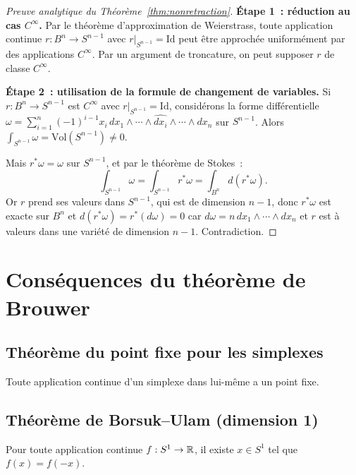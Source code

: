 \begin{proof}[Preuve analytique du Th\'eor\`eme~\ref{thm:nonretraction}]
\textbf{\'Etape 1~: r\'eduction au cas $C^\infty$.}
Par le th\'eor\`eme d'approximation de Weierstrass, toute application continue
$r : B^n \to S^{n-1}$ avec $r|_{S^{n-1}} = \mathrm{Id}$ peut \^etre approch\'ee
uniform\'ement par des applications $C^\infty$. Par un argument de troncature,
on peut supposer $r$ de classe $C^\infty$.

\textbf{\'Etape 2~: utilisation de la formule de changement de variables.}
Si $r : B^n \to S^{n-1}$ est $C^\infty$ avec $r|_{S^{n-1}} = \mathrm{Id}$,
consid\'erons la forme diff\'erentielle $\omega = \sum_{i=1}^n (-1)^{i-1} x_i \,
dx_1 \wedge \cdots \wedge \widehat{dx_i} \wedge \cdots \wedge dx_n$ sur $S^{n-1}$.
Alors $\int_{S^{n-1}} \omega = \mathrm{Vol}(S^{n-1}) \neq 0$.

Mais $r^*\omega = \omega$ sur $S^{n-1}$, et par le th\'eor\`eme de Stokes~:
\[
    \int_{S^{n-1}} \omega = \int_{S^{n-1}} r^*\omega = \int_{B^n} d(r^*\omega).
\]
Or $r$ prend ses valeurs dans $S^{n-1}$, qui est de dimension $n-1$, donc
$r^*\omega$ est exacte sur $B^n$ et $d(r^*\omega) = r^*(d\omega) = 0$ car
$d\omega = n \, dx_1 \wedge \cdots \wedge dx_n$ et $r$ est \`a valeurs dans une
vari\'et\'e de dimension $n-1$. Contradiction.
\end{proof}

\section{Cons\'equences du th\'eor\`eme de Brouwer}

\subsection{Th\'eor\`eme du point fixe pour les simplexes}

\begin{corollaire}
Toute application continue d'un simplexe dans lui-m\^eme a un point fixe.
\end{corollaire}

\subsection{Th\'eor\`eme de Borsuk--Ulam (dimension 1)}

\begin{theoreme}
Pour toute application continue $f : S^1 \to \mathbb{R}$, il existe $x \in S^1$ tel
que $f(x) = f(-x)$.
\end{theoreme}

